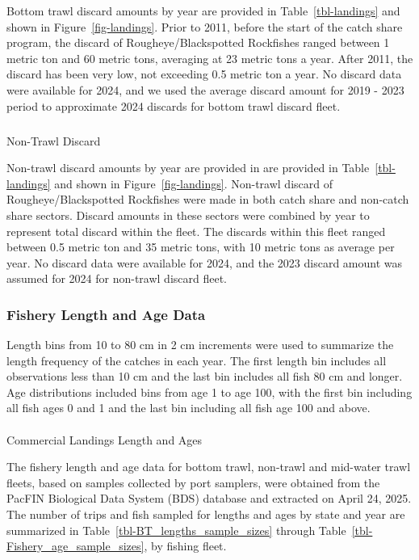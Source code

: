 \documentclass[
]{scrartcl}
\makeatletter
\let\oldparagraph\paragraph
\renewcommand{\paragraph}{
    \@ifstar
      \xxxParagraphStar
      \xxxParagraphNoStar
  }
\newcommand{\xxxParagraphStar}[1]{\oldparagraph*{#1}\mbox{}}
\newcommand{\xxxParagraphNoStar}[1]{\oldparagraph{#1}\mbox{}}
\let\oldsubparagraph\subparagraph
\renewcommand{\subparagraph}{
    \@ifstar
      \xxxSubParagraphStar
      \xxxSubParagraphNoStar
  }
\newcommand{\xxxSubParagraphStar}[1]{\oldsubparagraph*{#1}\mbox{}}
\newcommand{\xxxSubParagraphNoStar}[1]{\oldsubparagraph{#1}\mbox{}}
\makeatother
\begin{document}
Bottom trawl discard amounts by year are provided in
Table~\ref{tbl-landings} and shown in Figure~\ref{fig-landings}. Prior
to 2011, before the start of the catch share program, the discard of
Rougheye/Blackspotted Rockfishes ranged between 1 metric ton and 60
metric tons, averaging at 23 metric tons a year. After 2011, the discard
has been very low, not exceeding 0.5 metric ton a year. No discard data
were available for 2024, and we used the average discard amount for 2019
- 2023 period to approximate 2024 discards for bottom trawl discard
fleet.

\subparagraph{Non-Trawl Discard}\label{non-trawl-discard}

Non-trawl discard amounts by year are provided in are provided in
Table~\ref{tbl-landings} and shown in Figure~\ref{fig-landings}.
Non-trawl discard of Rougheye/Blackspotted Rockfishes were made in both
catch share and non-catch share sectors. Discard amounts in these
sectors were combined by year to represent total discard within the
fleet. The discards within this fleet ranged between 0.5 metric ton and
35 metric tons, with 10 metric tons as average per year. No discard data
were available for 2024, and the 2023 discard amount was assumed for
2024 for non-trawl discard fleet.

\subsubsection{Fishery Length and Age
Data}\label{fishery-length-and-age-data}

Length bins from 10 to 80 cm in 2 cm increments were used to summarize
the length frequency of the catches in each year. The first length bin
includes all observations less than 10 cm and the last bin includes all
fish 80 cm and longer. Age distributions included bins from age 1 to age
100, with the first bin including all fish ages 0 and 1 and the last bin
including all fish age 100 and above.

\paragraph{Commercial Landings Length and
Ages}\label{commercial-landings-length-and-ages}

The fishery length and age data for bottom trawl, non-trawl and
mid-water trawl fleets, based on samples collected by port samplers,
were obtained from the PacFIN Biological Data System (BDS) database and
extracted on April 24, 2025. The number of trips and fish sampled for
lengths and ages by state and year are summarized in
Table~\ref{tbl-BT_lengths_sample_sizes} through
Table~\ref{tbl-Fishery_age_sample_sizes}, by fishing fleet.
\end{document}
